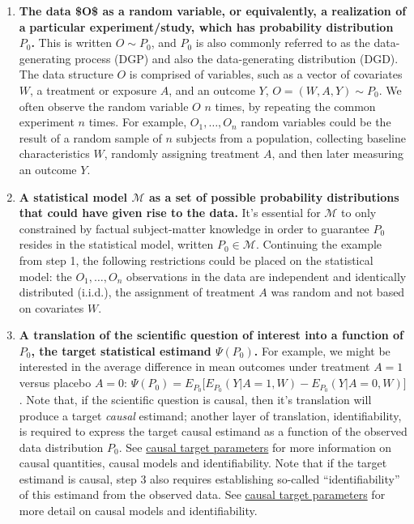 \documentclass[
  12pt, krantz2,
]{book}
\providecommand{\tightlist}{%
  \setlength{\itemsep}{0pt}\setlength{\parskip}{0pt}}
\theoremstyle{definition}
\theoremstyle{definition}
\theoremstyle{definition}
\newcommand{\M}{\mathcal{M}}
\newcommand{\1}{\mathbbm{1}}
\begin{document}
\begin{enumerate}
\def\labelenumi{\arabic{enumi}.}
\tightlist
\item
  \textbf{The data \$O\$ as a random variable, or equivalently, a realization of a}
  \textbf{particular experiment/study, which has probability distribution \(P_0\).}
  This is written \(O \sim P_0\), and \(P_0\) is also commonly referred to as the
  data-generating process (DGP) and also the data-generating distribution
  (DGD). The data structure \(O\) is comprised of variables, such as a
  vector of covariates \(W\), a treatment or exposure \(A\), and an outcome \(Y\),
  \(O=(W,A,Y) \sim P_0\). We often observe the random variable \(O\) \(n\) times, by
  repeating the common experiment \(n\) times. For example, \(O_1,\ldots, O_n\)
  random variables could be the result of a random sample of \(n\) subjects from
  a population, collecting baseline characteristics \(W\), randomly assigning
  treatment \(A\), and then later measuring an outcome \(Y\).
\item
  \textbf{A statistical model \(\M\) as a set of possible probability distributions}
  \textbf{that could have given rise to the data.} It's essential for \(\M\) to only
  constrained by factual subject-matter knowledge in order to guarantee \(P_0\)
  resides in the statistical model, written \(P_0 \in \M\). Continuing
  the example from step 1, the following restrictions could be placed on the
  statistical model: the \(O_1, \ldots, O_n\) observations in the data are
  independent and identically distributed (i.i.d.), the assignment of
  treatment \(A\) was random and not based on covariates \(W\).
\item
  \textbf{A translation of the scientific question of interest into a function of}
  \textbf{\(P_0\), the target statistical estimand \(\Psi(P_0)\).} For example, we might
  be interested in the average difference in mean outcomes under treatment
  \(A=1\) versus placebo \(A=0\):
  \(\Psi(P_0)=E_{P_0}\Big[E_{P_0}(Y|A=1,W)−E_{P_0}(Y|A=0,W)\Big]\). Note
  that, if the scientific question is causal, then it's translation will
  produce a target \emph{causal} estimand; another layer of translation,
  identifiability, is required to express the target causal estimand as a
  function of the observed data distribution \(P_0\). See \protect\hyperlink{causal}{causal target
  parameters} for more information on causal quantities, causal models
  and identifiability.
  Note that if the target estimand is causal, step 3 also requires establishing
  so-called ``identifiability'' of this estimand from the observed data. See \protect\hyperlink{causal}{causal
  target parameters} for more detail on causal models and identifiability.
\end{enumerate}
\end{document}
